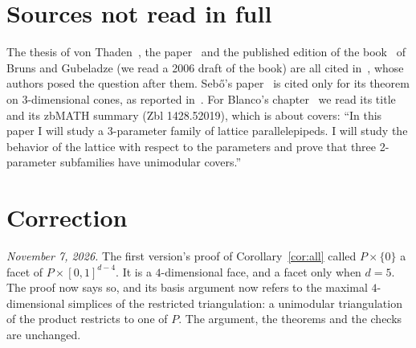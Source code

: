 \documentclass[11pt]{article}
\theoremstyle{definition}
\begin{document}
\begin{appendices}
\section{Sources not read in full}\label{app:unread}

The thesis of von Thaden~\cite{vT}, the paper~\cite{BG} and the published
edition of the book~\cite{BGbook} of Bruns and Gubeladze (we read a 2006
draft of the book) are all cited in~\cite{HPPS}, whose authors posed the
question after them. Sebő's paper~\cite{Se} is cited only for its theorem
on 3-dimensional cones, as reported in~\cite{BGT}. For Blanco's
chapter~\cite{Bl} we read its title and its zbMATH summary (Zbl
1428.52019), which is about covers: ``In this paper I will study a
3-parameter family of lattice parallelepipeds. I will study the behavior of
the lattice with respect to the parameters and prove that three 2-parameter
subfamilies have unimodular covers.''
\section{Correction}\label{app:correction}

\emph{November 7, 2026.} The first version's proof of
Corollary~\ref{cor:all} called $P\times\{0\}$ a facet of
$P\times[0,1]^{d-4}$. It is a $4$-dimensional face, and a facet only when
$d=5$. The proof now says so, and its basis argument now refers to the
maximal $4$-dimensional simplices of the restricted triangulation: a
unimodular triangulation of the product restricts to one of $P$. The
argument, the theorems and the checks are unchanged.

\end{appendices}
\end{document}
